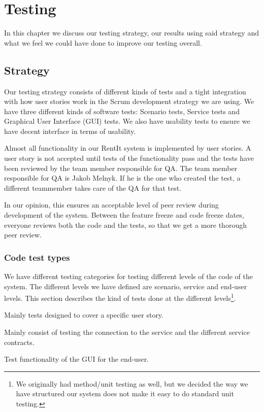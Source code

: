 \chapter{Testing}
\label{Testing}
In this chapter we discuss our testing strategy, our results using said strategy and what we feel we could have done to improve our testing overall.
\section{Strategy}
\label{Testing_Strategy}
Our testing strategy consists of different kinds of tests and a tight integration with how user stories work in the Scrum development strategy we are using. We have three different kinds of software tests: Scenario tests, Service tests and Graphical User Interface (GUI) tests. We also have usability tests to ensure we have decent interface in terms of usability.

Almost all functionality in our RentIt system is implemented by user stories. A user story is not accepted until tests of the functionality pass and the tests have been reviewed by the team member responsible for QA. The team member responsible for QA is Jakob Melnyk. If he is the one who created the test, a different teammember takes care of the QA for that test.

In our opinion, this ensures an acceptable level of peer review during development of the system. Between the feature freeze and code freeze dates, everyone reviews both the code and the tests, so that we get a more thorough peer review.

\subsection{Code test types}
\label{Testing_Strategy_Types}
We have different testing categories for testing different levels of the code of the system. The different levels we have defined are scenario, service and end-user levels. This section describes the kind of tests done at the different levels\footnote{We originally had method/unit testing as well, but we decided the way we have structured our system does not make it easy to do standard unit testing.}.

\begin{my_description}
\item[Scenario-level] Mainly tests designed to cover a specific user story.
\item[Service-level] Mainly consist of testing the connection to the service and the different service contracts.
\item[End-User-level] Test functionality of the GUI for the end-user.
\end{my_description}

